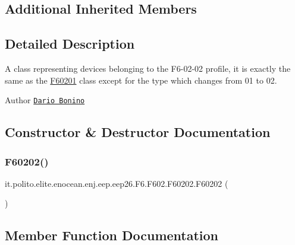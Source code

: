 \subsection*{Additional Inherited Members}


\subsection{Detailed Description}
A class representing devices belonging to the F6-\/02-\/02 profile, it is exactly the same as the \hyperlink{classit_1_1polito_1_1elite_1_1enocean_1_1enj_1_1eep_1_1eep26_1_1_f6_1_1_f602_1_1_f60201}{F60201} class except for the type which changes from 01 to 02.

\begin{DoxyAuthor}{Author}
\href{mailto:dario.bonino@gmail.com}{\tt Dario Bonino} 
\end{DoxyAuthor}


\subsection{Constructor \& Destructor Documentation}
\hypertarget{classit_1_1polito_1_1elite_1_1enocean_1_1enj_1_1eep_1_1eep26_1_1_f6_1_1_f602_1_1_f60202_aecb9c9075a614503da99a6028dcc6f34}{}\label{classit_1_1polito_1_1elite_1_1enocean_1_1enj_1_1eep_1_1eep26_1_1_f6_1_1_f602_1_1_f60202_aecb9c9075a614503da99a6028dcc6f34} 
\subsubsection{\texorpdfstring{F60202()}{F60202()}}
{\footnotesize\ttfamily it.\+polito.\+elite.\+enocean.\+enj.\+eep.\+eep26.\+F6.\+F602.\+F60202.\+F60202 (\begin{DoxyParamCaption}{ }\end{DoxyParamCaption})}



\subsection{Member Function Documentation}
\hypertarget{classit_1_1polito_1_1elite_1_1enocean_1_1enj_1_1eep_1_1eep26_1_1_f6_1_1_f602_1_1_f60202_af4037d625c68e575343f5e4f02025a87}{}\label{classit_1_1polito_1_1elite_1_1enocean_1_1enj_1_1eep_1_1eep26_1_1_f6_1_1_f602_1_1_f60202_af4037d625c68e575343f5e4f02025a87} 
